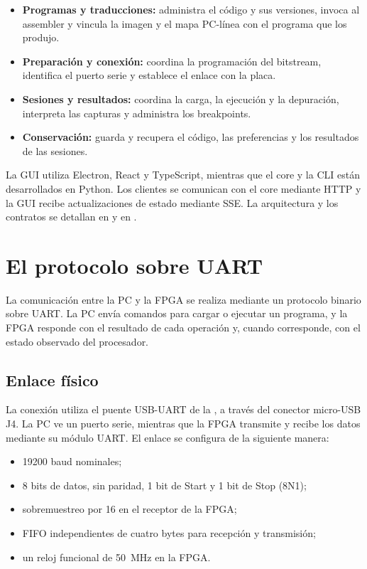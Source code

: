 \begin{itemize}
  \item \textbf{Programas y traducciones:} administra el código y sus
    versiones, invoca al assembler y vincula la imagen y el mapa PC-línea con
    el programa que los produjo.
  \item \textbf{Preparación y conexión:} coordina la programación del
    bitstream, identifica el puerto serie y establece el enlace con la placa.
  \item \textbf{Sesiones y resultados:} coordina la carga, la ejecución y la
    depuración, interpreta las capturas y administra los breakpoints.
  \item \textbf{Conservación:} guarda y recupera el código, las preferencias y
    los resultados de las sesiones.
\end{itemize}

La GUI utiliza Electron, React y TypeScript, mientras que el core y la CLI están
desarrollados en Python. Los clientes se comunican con el core mediante HTTP y
la GUI recibe actualizaciones de estado mediante SSE. La arquitectura y los
contratos se detallan en  y en .

\section{El protocolo sobre UART}

La comunicación entre la PC y la FPGA se realiza mediante un protocolo binario
sobre UART. La PC envía comandos para cargar o ejecutar un programa, y la FPGA
responde con el resultado de cada operación y, cuando corresponde, con el
estado observado del procesador.

\subsection{Enlace físico}

La conexión utiliza el puente USB-UART de la , a través del
conector micro-USB J4. La PC ve un puerto serie, mientras que la FPGA transmite
y recibe los datos mediante su módulo UART. El enlace se configura de la
siguiente manera:

\begin{itemize}
  \item \num{19200} baud nominales;
  \item 8 bits de datos, sin paridad, 1 bit de Start y 1 bit de Stop (8N1);
  \item sobremuestreo por 16 en el receptor de la FPGA;
  \item FIFO independientes de cuatro bytes para recepción y transmisión;
  \item un reloj funcional de \SI{50}{\mega\hertz} en la FPGA.
\end{itemize}

